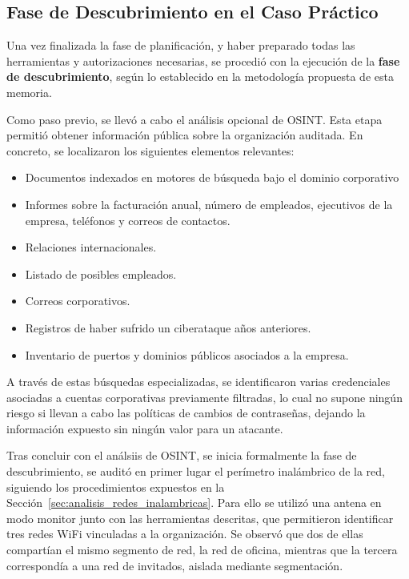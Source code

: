 \documentclass[a4paper, 11pt]{article}
\begin{document}
\subsection{Fase de Descubrimiento en el Caso Práctico}

Una vez finalizada la fase de planificación, y haber preparado todas las herramientas y autorizaciones necesarias, se procedió con la ejecución de la \textbf{fase de descubrimiento}, según lo establecido en la metodología propuesta de esta memoria.



Como paso previo, se llevó a cabo el análisis opcional de OSINT. Esta etapa permitió obtener información pública sobre la organización auditada. En concreto, se localizaron los siguientes elementos relevantes:

\begin{itemize}
    \item Documentos indexados en motores de búsqueda bajo el dominio corporativo
    \item Informes sobre la facturación anual, número de empleados, ejecutivos de la empresa, teléfonos y correos de contactos.
    \item Relaciones internacionales.
    \item Listado de posibles empleados.
    \item Correos corporativos.
    \item Registros de haber sufrido un ciberataque años anteriores.
    \item Inventario de puertos y dominios públicos asociados a la empresa.
\end{itemize}



A través de estas búsquedas especializadas, se identificaron varias credenciales asociadas a cuentas corporativas previamente filtradas, lo cual no supone ningún riesgo si llevan a cabo las políticas de cambios de contraseñas, dejando la información expuesto sin ningún valor para un atacante.



Tras concluir con el análsiis de OSINT, se inicia formalmente la fase de descubrimiento, se auditó en primer lugar el perímetro inalámbrico de la red, 
siguiendo los procedimientos expuestos en la Sección~\ref{sec:analisis_redes_inalambricas}. 
Para ello se utilizó una antena en modo monitor junto con las herramientas descritas, que permitieron identificar tres redes WiFi vinculadas a la organización. Se observó que dos de ellas compartían el mismo segmento de red, la red de oficina, mientras que la tercera correspondía a una red de invitados, aislada mediante segmentación.
\end{document}
